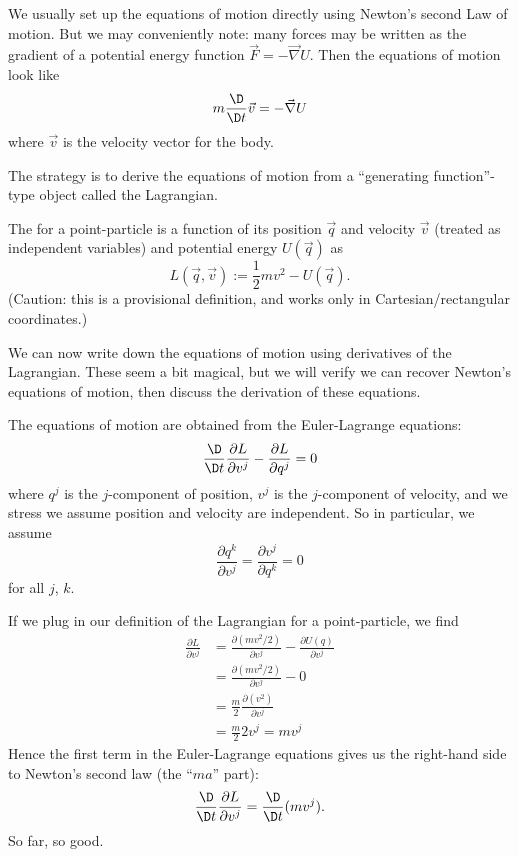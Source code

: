 \M
We usually set up the equations of motion directly using Newton's second
Law of motion. But we may conveniently note: many forces may be written
as the gradient of a potential energy function $\vec{F}=-\vec{\nabla}U$.
Then the equations of motion look like
\begin{equation}
m\frac{\D}{\D t}\vec{v} = -\vec{\nabla}U
\end{equation}
where $\vec{v}$ is the velocity vector for the body.

The strategy is to derive the equations of motion from a ``generating
function''-type object called the Lagrangian.

\begin{definition}
The  for a point-particle is a function of its
position $\vec{q}$ and velocity $\vec{v}$ (treated as independent
variables) and potential energy $U(\vec{q})$ as
\begin{equation}
L(\vec{q},\vec{v}) := \frac{1}{2}mv^{2} - U(\vec{q}).
\end{equation}
(Caution: this is a provisional definition, and works only in
Cartesian/rectangular coordinates.)
\end{definition}

We can now write down the equations of motion using derivatives of the
Lagrangian. These seem a bit magical, but we will verify we can recover
Newton's equations of motion, then discuss the derivation of these
equations.

The equations of motion are obtained from the Euler-Lagrange equations:
\begin{equation}
\frac{\D}{\D t}\frac{\partial L}{\partial v^{j}} - \frac{\partial L}{\partial q^{j}} = 0
\end{equation}
where $q^{j}$ is the $j$-component of position, $v^{j}$ is the
$j$-component of velocity, and we stress we assume position and velocity
are independent. So in particular, we assume
\begin{equation}
\frac{\partial q^{k}}{\partial v^{j}} = \frac{\partial v^{j}}{\partial q^{k}} = 0
\end{equation}
for all $j$, $k$.

\M
If we plug in our definition of the Lagrangian for a point-particle, we
find
\begin{subequations}
\begin{align}
\frac{\partial L}{\partial v^{j}}
&= \frac{\partial (mv^{2}/2)}{\partial v^{j}} - \frac{\partial U(q)}{\partial v^{j}}\\
&= \frac{\partial (mv^{2}/2)}{\partial v^{j}} - 0\\
&= \frac{m}{2}\frac{\partial (v^{2})}{\partial v^{j}}\\
&= \frac{m}{2}2 v^{j} = mv^{j}
\end{align}
\end{subequations}
Hence the first term in the Euler-Lagrange equations gives us the
right-hand side to Newton's second law (the ``$ma$'' part):
\begin{equation}
\frac{\D}{\D t}\frac{\partial L}{\partial v^{j}} =
\frac{\D}{\D t}(m v^{j}).
\end{equation}
So far, so good.

